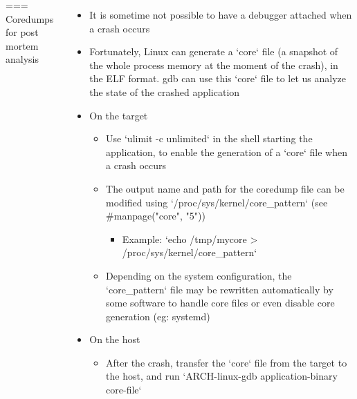 \begin{columns}[T]
=== Coredumps for post mortem analysis
  \begin{itemize}
  \item It is sometime not possible to have a debugger attached when a
	  crash occurs
  \item Fortunately, Linux can generate a `core` file (a snapshot of
    the whole process memory at the moment of the crash), in the ELF
      format. gdb can use this `core` file to let us analyze the state
      of the crashed application
  \item On the target
    \begin{itemize}
    \item Use `ulimit -c unlimited` in the shell starting the
      application, to enable the generation of a `core` file
      when a crash occurs
    \item The output name and path for the coredump file can be modified using
	    `/proc/sys/kernel/core_pattern` (see #manpage("core", "5"))
		    \begin{itemize}
			    \item Example: `echo /tmp/mycore >
				    /proc/sys/kernel/core_pattern`
		    \end{itemize}
    \item Depending on the system configuration, the `core_pattern`
      file may be rewritten automatically by some software to handle core
        files or even disable core generation (eg: systemd)
    \end{itemize}
  \item On the host
    \begin{itemize}
    \item After the crash, transfer the `core` file from the target to
      the host, and run
      `ARCH-linux-gdb application-binary core-file`
    \end{itemize}
  \end{itemize}



\end{columns}

